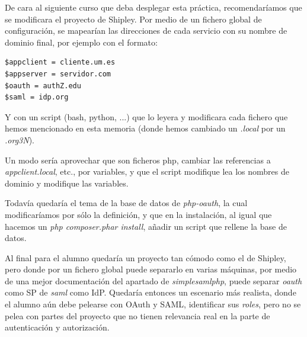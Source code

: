 \documentclass[]{article}
\begin{document}
\hfill

De cara al siguiente curso que deba desplegar esta práctica, recomendaríamos que se modificara el proyecto de Shipley. Por medio de un fichero global de configuración, se mapearían las direcciones de cada servicio con su nombre de dominio final, por ejemplo con el formato:

\begin{verbatim}
$appclient = cliente.um.es
$appserver = servidor.com
$oauth = authZ.edu
$saml = idp.org
\end{verbatim} 

Y con un script (bash, python, ...) que lo leyera y modificara cada fichero que hemos mencionado en esta memoria (donde hemos cambiado un \textit{.local} por un \textit{.org3N}).

Un modo sería aprovechar que son ficheros php, cambiar las referencias a \textit{appclient.local}, etc., por variables, y que el script modifique lea los nombres de dominio y modifique las variables.

Todavía quedaría el tema de la base de datos de \textit{php-oauth}, la cual modificaríamos por sólo la definición, y que en la instalación, al igual que hacemos un \textit{php composer.phar install}, añadir un script que rellene la base de datos.


\hfill


Al final para el alumno quedaría un proyecto tan cómodo como el de Shipley, pero donde por un fichero global puede separarlo en varias máquinas, por medio de una mejor documentación del apartado de \textit{simplesamlphp}, puede separar \textit{oauth} como SP de \textit{saml} como IdP. Quedaría entonces un escenario más realista, donde el alumno aún debe pelearse con OAuth y SAML, identificar sus \textit{roles}, pero no se pelea con partes del proyecto que no tienen relevancia real en la parte de autenticación y autorización.
\end{document}
